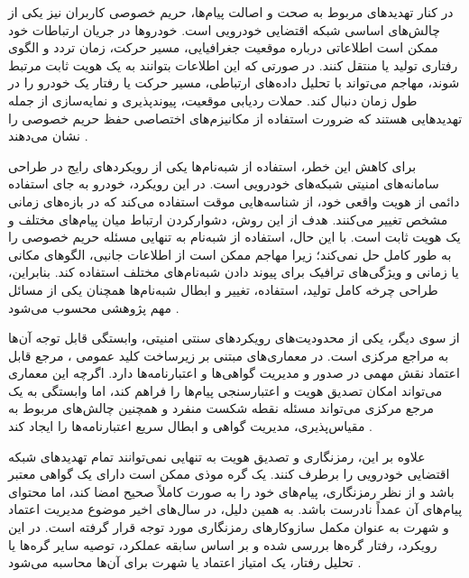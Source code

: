 \documentclass[12pt,a4paper]{article}
\begin{document}
در کنار تهدیدهای مربوط به صحت و اصالت پیام‌ها، حریم خصوصی کاربران نیز یکی از چالش‌های اساسی شبکه اقتضایی خودرویی است. خودروها در جریان ارتباطات خود ممکن است اطلاعاتی درباره موقعیت جغرافیایی، مسیر حرکت، زمان تردد و الگوی رفتاری تولید یا منتقل کنند. در صورتی که این اطلاعات بتوانند به یک هویت ثابت مرتبط شوند، مهاجم می‌تواند با تحلیل داده‌های ارتباطی، مسیر حرکت یا رفتار یک خودرو را در طول زمان دنبال کند. حملات ردیابی موقعیت، پیوندپذیری  و نمایه‌سازی  از جمله تهدیدهایی هستند که ضرورت استفاده از مکانیزم‌های اختصاصی حفظ حریم خصوصی را نشان می‌دهند \cite{farsimadanReviewSecurityChallenges2025,rahmawatiagustinaSystematicLiteratureReview2025}.

برای کاهش این خطر، استفاده از شبه‌نام‌ها  یکی از رویکردهای رایج در طراحی سامانه‌های امنیتی شبکه‌های خودرویی است. در این رویکرد، خودرو به جای استفاده دائمی از هویت واقعی خود، از شناسه‌هایی موقت استفاده می‌کند که در بازه‌های زمانی مشخص تغییر می‌کنند. هدف از این روش، دشوار‌کردن ارتباط میان پیام‌های مختلف و یک هویت ثابت است. با این حال، استفاده از شبه‌نام به تنهایی مسئله حریم خصوصی را به طور کامل حل نمی‌کند؛ زیرا مهاجم ممکن است از اطلاعات جانبی، الگوهای مکانی یا زمانی و ویژگی‌های ترافیک برای پیوند دادن شبه‌نام‌های مختلف استفاده کند. بنابراین، طراحی چرخه کامل تولید، استفاده، تغییر و ابطال شبه‌نام‌ها همچنان یکی از مسائل مهم پژوهشی محسوب می‌شود \cite{rahmawatiagustinaSystematicLiteratureReview2025,luPseudonymChangingSocial2012}.

از سوی دیگر، یکی از محدودیت‌های رویکردهای سنتی امنیتی، وابستگی قابل توجه آن‌ها به مراجع مرکزی است. در معماری‌های مبتنی بر زیرساخت کلید عمومی ، مرجع قابل اعتماد  نقش مهمی در صدور و مدیریت گواهی‌ها و اعتبارنامه‌ها دارد. اگرچه این معماری می‌تواند امکان تصدیق هویت و اعتبارسنجی پیام‌ها را فراهم کند، اما وابستگی به یک مرجع مرکزی می‌تواند مسئله نقطه شکست منفرد  و همچنین چالش‌های مربوط به مقیاس‌پذیری، مدیریت گواهی و ابطال سریع اعتبارنامه‌ها را ایجاد کند \cite{rahmawatiagustinaSystematicLiteratureReview2025,VanetSecurityPrivacy}.

علاوه بر این، رمزنگاری و تصدیق هویت به تنهایی نمی‌توانند تمام تهدیدهای شبکه اقتضایی خودرویی را برطرف کنند. یک گره موذی ممکن است دارای یک گواهی معتبر باشد و از نظر رمزنگاری، پیام‌های خود را به صورت کاملاً صحیح امضا کند، اما محتوای پیام‌های آن عمداً نادرست باشد. به همین دلیل، در سال‌های اخیر موضوع مدیریت اعتماد و شهرت به عنوان مکمل سازوکارهای رمزنگاری مورد توجه قرار گرفته است.
در این رویکرد، رفتار گره‌ها بررسی شده و بر اساس سابقه عملکرد، توصیه سایر گره‌ها یا تحلیل رفتار، یک امتیاز اعتماد یا شهرت برای آن‌ها محاسبه می‌شود \cite{razaBlockchainBasedReputationTrust2024,ghovanlooyghajarSBTMSScalableBlockchain2021}.
\end{document}
